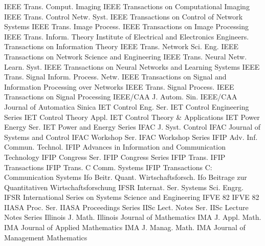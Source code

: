 {IEEE Trans. Comput. Imaging}
{IEEE Transactions on Computational Imaging}
{IEEE Trans. Control Netw. Syst.}
{IEEE Transactions on Control of Network Systems}
{IEEE Trans. Image Process.}
{IEEE Transactions on Image Processing}
{IEEE Trans. Inform. Theory}
{Institute of Electrical and Electronics Engineers. Transactions on Information Theory}
{IEEE Trans. Network Sci. Eng.}
{IEEE Transactions on Network Science and Engineering}
{IEEE Trans. Neural Netw. Learn. Syst.}
{IEEE Transactions on Neural Networks and Learning Systems}
{IEEE Trans. Signal Inform. Process. Netw.}
{IEEE Transactions on Signal and Information Processing over Networks}
{IEEE Trans. Signal Process.}
{IEEE Transactions on Signal Processing}
{IEEE/CAA J. Autom. Sin.}
{IEEE/CAA Journal of Automatica Sinica}
{IET Control Eng. Ser.}
{IET Control Engineering Series}
{IET Control Theory Appl.}
{IET Control Theory & Applications}
{IET Power Energy Ser.}
{IET Power and Energy Series}
{IFAC J. Syst. Control}
{IFAC Journal of Systems and Control}
{IFAC Workshop Ser.}
{IFAC Workshop Series}
{IFIP Adv. Inf. Commun. Technol.}
{IFIP Advances in Information and Communication Technology}
{IFIP Congress Ser.}
{IFIP Congress Series}
{IFIP Trans.}
{IFIP Transactions}
{IFIP Trans. C Comm. Systems}
{IFIP Transactions C: Communication Systems}
{Ifo Beitr. Quant. Wirtschaftsforsch.}
{Ifo Beitrage zur Quantitativen Wirtschaftsforschung}
{IFSR Internat. Ser. Systems Sci. Engrg.}
{IFSR International Series on Systems Science and Engineering}
{IFVE 82}
{IFVE 82}
{IIASA Proc. Ser.}
{IIASA Proceedings Series}
{IISc Lect. Notes Ser.}
{IISc Lecture Notes Series}
{Illinois J. Math.}
{Illinois Journal of Mathematics}
{IMA J. Appl. Math.}
{IMA Journal of Applied Mathematics}
{IMA J. Manag. Math.}
{IMA Journal of Management Mathematics}
